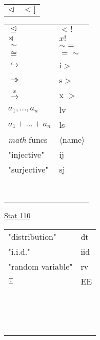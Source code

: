 \documentclass[10pt]{beamer}
\begin{document}
\begin{frame}
\begin{tabular}{ll}
$\triangleleft$ & $<]$ \\
\end{tabular}
\hspace*{1ex}
\vrule
\begin{tabular}{ll}
$\trianglelefteq$ & $<!$ \\
$\rtimes$ & $x!$ \\
$\simeq$ & $\sim=$ \\
$\cong$ & $=\sim$ \\
$\hookrightarrow$ & i$>$ \\
$\twoheadrightarrow$ & s$>$ \\
$\xrightarrow{x}$ & x $>$ \\
$a_1,\ldots,a_n$ & lv \\
$a_1+\ldots+a_n$ & ls \\
\textit{math} funcs & $\langle$name$\rangle$\\ %
"injective" & ij \\
"surjective" & sj \\
\\
\\
\\
\\
\\
\\
\\
\\
\end{tabular}

\end{frame}


\begin{frame}
\underline{Stat 110}

\begin{tabular}{ll}
"distribution" & dt \\
"i.i.d." & iid \\
"random variable" & rv \\
$\mathbb{E}$ & EE \\
\\
\\
\\
\\
\\
\\
\\
\\
\\
\\
\\
\\
\\
\\
\\
\end{tabular}

\end{frame}
\end{document}
